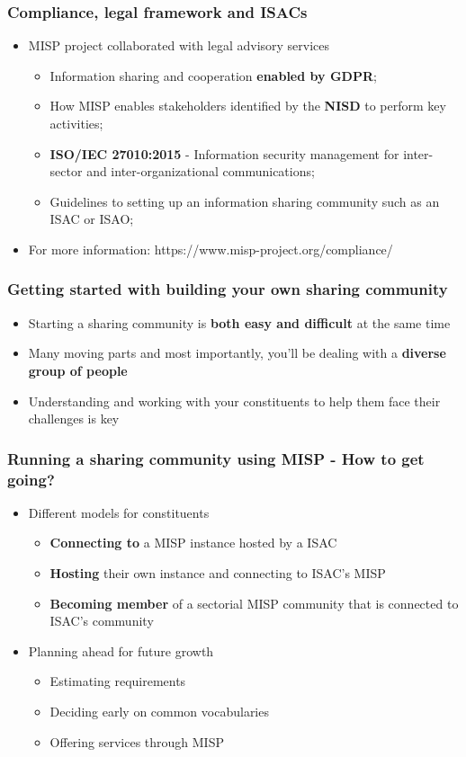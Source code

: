 \begin{frame}
\frametitle{Compliance, legal framework and ISACs}
\begin{itemize}
	\item MISP project collaborated with legal advisory services
	\begin{itemize}
		\item Information sharing and cooperation {\bf enabled by GDPR};
		\item How MISP enables stakeholders identified by the {\bf NISD} to perform key activities;
        \item {\bf ISO/IEC 27010:2015} - Information security management for inter-sector and inter-organizational communications;
        \item Guidelines to setting up an information sharing community such as an ISAC or ISAO;
	\end{itemize}
	\item For more information: https://www.misp-project.org/compliance/
\end{itemize}
\end{frame}

\begin{frame}
\frametitle{Getting started with building your own sharing community}
\begin{itemize}
	\item Starting a sharing community is {\bf both easy and difficult} at the same time
    \item Many moving parts and most importantly, you'll be dealing with a {\bf diverse group of people}
	\item Understanding and working with your constituents to help them face their challenges is key
\end{itemize}
\end{frame}

\begin{frame}
\frametitle{Running a sharing community using MISP - How to get going?}
\begin{itemize}
	\item Different models for constituents
	\begin{itemize}
        \item {\bf Connecting to} a MISP instance hosted by a ISAC 
        \item {\bf Hosting} their own instance and connecting to ISAC's MISP
        \item {\bf Becoming member} of a sectorial MISP community that is connected to ISAC's community
	\end{itemize}
	\item Planning ahead for future growth
	\begin{itemize}
		\item Estimating requirements
		\item Deciding early on common vocabularies
		\item Offering services through MISP
	\end{itemize}
\end{itemize}
\end{frame}

